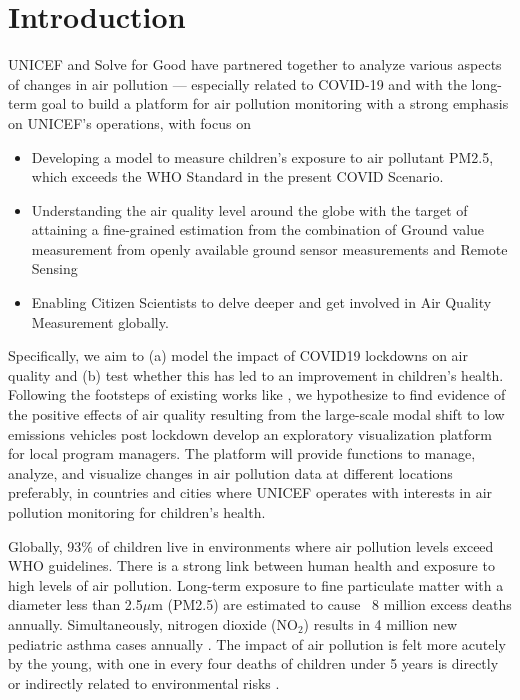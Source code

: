 \section{Introduction}\label{sec:intro}
UNICEF and Solve for Good have partnered together to analyze various aspects of changes in air pollution — especially related to COVID-19 and with the long-term goal to build a platform for air pollution monitoring with a strong emphasis on UNICEF’s operations, with focus on
\begin{itemize}
    \item Developing a model to measure children’s exposure to air pollutant PM2.5, which exceeds the WHO Standard in the present COVID Scenario.
    \item Understanding the air quality level around the globe with the target of attaining a fine-grained estimation from the combination of Ground value measurement from openly available ground sensor measurements and Remote Sensing
    \item Enabling Citizen Scientists to delve deeper and get involved in Air Quality Measurement globally.
\end{itemize} 
%
Specifically, we aim to (a) model the impact of COVID19 lockdowns on air quality and (b) test whether this has led to an improvement in children’s health. Following the footsteps of existing works like \citet{Borneman,Mahato}, we hypothesize to find evidence of the positive effects of air quality resulting from the large-scale modal shift to low emissions vehicles post lockdown develop an exploratory visualization platform for local program managers. The platform will provide functions to manage, analyze, and visualize changes in air pollution data at different locations preferably, in countries and cities where UNICEF operates with interests in air pollution monitoring for children’s health.

Globally, 93\% of children live in environments where air pollution levels exceed WHO guidelines. There is a strong link between human health and exposure to high levels of air pollution. Long-term exposure to fine particulate matter with a diameter less than 2.5$\mu$m (PM2.5) are estimated to cause ~8 million excess deaths annually. Simultaneously, nitrogen dioxide (NO$_2$) results in 4 million new pediatric asthma cases annually \cite{Venter}. The impact of air pollution is felt more acutely by the young, with one in every four deaths of children under 5 years is directly or indirectly related to environmental risks \cite{who}.

